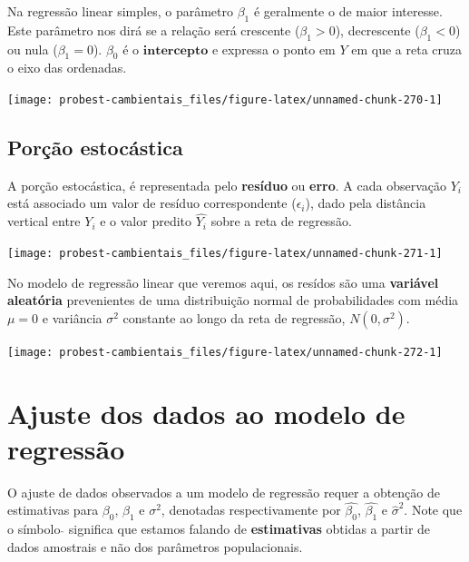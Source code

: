 \documentclass[
]{book}
\begin{document}
Na regressão linear simples, o parâmetro \(\beta_1\) é geralmente o de maior interesse. Este parâmetro nos dirá se a relação será crescente (\(\beta_1 > 0\)), decrescente (\(\beta_1 < 0\)) ou nula (\(\beta_1 = 0\)). \(\beta_0\) é o \(\textbf{intercepto}\) e expressa o ponto em \(Y\) em que a reta cruza o eixo das ordenadas.

\begin{center}\texttt{[image: probest-cambientais\_files/figure-latex/unnamed-chunk-270-1]} \end{center}

\hypertarget{poruxe7uxe3o-estocuxe1stica}{%
\subsection{Porção estocástica}\label{poruxe7uxe3o-estocuxe1stica}}

A porção estocástica, é representada pelo \textbf{resíduo} ou \textbf{erro}. A cada observação \(Y_i\) está associado um valor de resíduo correspondente (\(\epsilon_i\)), dado pela distância vertical entre \(Y_i\) e o valor predito \(\hat{Y_i}\) sobre a reta de regressão.

\begin{center}\texttt{[image: probest-cambientais\_files/figure-latex/unnamed-chunk-271-1]} \end{center}

No modelo de regressão linear que veremos aqui, os resídos são uma \textbf{variável aleatória} prevenientes de uma distribuição normal de probabilidades com média \(\mu = 0\) e variância \(\sigma^2\) constante ao longo da reta de regressão, \(N(0, \sigma^2)\).

\begin{center}\texttt{[image: probest-cambientais\_files/figure-latex/unnamed-chunk-272-1]} \end{center}

\hypertarget{ajuste-dos-dados-ao-modelo-de-regressuxe3o}{%
\section{Ajuste dos dados ao modelo de regressão}\label{ajuste-dos-dados-ao-modelo-de-regressuxe3o}}

O ajuste de dados observados a um modelo de regressão requer a obtenção de estimativas para \(\beta_0\), \(\beta_1\) e \(\sigma^2\), denotadas respectivamente por \(\hat{\beta_0}\), \(\hat{\beta_1}\) e \(\hat{\sigma}^2\). Note que o símbolo \(\hat{}\) significa que estamos falando de \textbf{estimativas} obtidas a partir de dados amostrais e não dos parâmetros populacionais.
\end{document}

